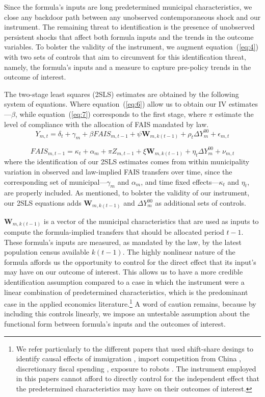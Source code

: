 \documentclass[dv_diss_main.tex]{subfiles}
\begin{document}
Since the formula's inputs are long predetermined municipal characteristics, we close any backdoor path between any unobserved contemporaneous shock and our instrument. The remaining threat to identification is the presence of unobserved persistent shocks that affect both formula inputs and the trends in the outcome variables. To bolster the validity of the instrument, we augment equation~(\ref{eq:4}) with two sets of controls that aim to circumvent for this identification threat, namely, the formula's inputs and a measure to capture pre-policy trends in the outcome of interest.

The two-stage least squares (2SLS) estimates are obtained by the following system of equations. Where equation~(\ref{eq:6}) allow us to obtain our IV estimates---$\beta$, while  equation~(\ref{eq:7}) corresponds to the first stage, where $\pi$ estimate the level of compliance with the allocation of FAIS mandated by law. 
\begin{equation} \label{eq:6}
Y_{m,t}=\delta_t + \gamma_m + \beta FAIS_{m,t-1} + \psi \textbf{W}_{m,k(t-1)} + \rho_t \Delta Y_m^{00} + \epsilon_{m,t}
\end{equation}

\begin{equation}\label{eq:7}
FAIS_{m,t-1}=\kappa_t + \alpha_m + \pi Z_{m,t-1} + \xi \textbf{W}_{m,k(t-1)} + \eta_t \Delta Y_m^{00} + \nu_{m,t}
\end{equation}
\noindent where the identification of our 2SLS estimates comes from within municipality variation in observed and law-implied FAIS transfers over time, since the corresponding set of municipal---$\gamma_m$ and $\alpha_m$, and time fixed effects---$\kappa_t$ and $\eta_t$,  are properly included. As mentioned, to bolster the validity of our instrument, our 2SLS equations adds  $\textbf{W}_{m,k(t-1)}$ and $\Delta Y_m^{00}$ as additional sets of controls. 

 $\textbf{W}_{m,k(t-1)}$ is a vector of the municipal characteristics that are used as inputs to compute the formula-implied transfers that should be allocated period $t - 1$. These formula's inputs are measured, as mandated by the law, by the latest population census available $k(t -1)$. The highly nonlinear nature of the formula affords us the opportunity to control for the direct effect that its input's may have on our outcome of interest. This allows us to have a more credible identification assumption compared to a case in which the instrument were  a linear combination of predetermined characteristics, which is the predominant case in the applied economics literature.\footnote{We refer particularly to the different papers that used shift-share desings to identify causal effects of immigration \citep{tabellini2020gifts}, import competition from China \citep{dell2019violent}, discretionary fiscal spending \cite{chodorow2012does}, exposure to robots \cite{acemoglu2020robots}. The instrument employed in this papers cannot afford to directly control for the independent effect that the predetermined characteristics may have on their outcomes of interest.} A word of caution remains, because by including this controls linearly, we impose an untestable assumption about the functional form between formula’s inputs and the outcomes of interest.
\end{document}
